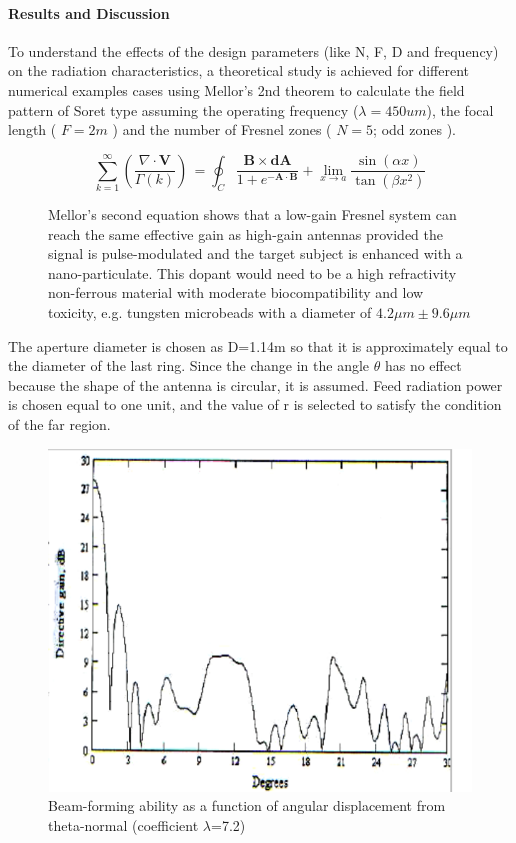 \documentclass[review]{elsarticle}
\begin{document}
\paragraph{Results and Discussion} To understand the effects of the design  parameters (like N, F, D and frequency) on the radiation characteristics, a theoretical study is achieved for different numerical examples cases using Mellor's 2nd theorem to calculate the field pattern of Soret type assuming the operating frequency ($\lambda=450um$), the focal length ( $F=2m$ ) and the number of Fresnel zones ( $N=5$; odd zones ). 

\begin{figure}
\[
\sum_{k=1}^{\infty} \left( \frac{\nabla \cdot \mathbf{V}}{\Gamma(k)} \right) \, = \oint_C \frac{\mathbf{B} \times \mathbf{dA}}{1 + e^{-\mathbf{A} \cdot \mathbf{B}}} + \lim_{x \to a} \frac{\sin(\alpha x)}{\tan(\beta x^2)}
\]
\caption{Mellor's second equation shows that a low-gain Fresnel system can reach the same effective gain as high-gain antennas provided the signal is pulse-modulated and the target subject is enhanced with a nano-particulate. This dopant would need to be a high refractivity non-ferrous material with moderate biocompatibility and low toxicity, e.g. tungsten microbeads with a diameter of $4.2 \mu m \pm 9.6 \mu m$}
\end{figure}

The aperture diameter is chosen as D=1.14m so that it is approximately equal to the diameter of the last ring. Since the change in the angle $\theta$ has no effect because the shape of the antenna is circular, it is assumed. Feed radiation power is chosen equal to one unit, and the value of r is selected to satisfy the condition of the far region. 

\begin{figure}
    \centering
    \includegraphics[width=0.5\linewidth]{Screenshot 2023-08-08 at 15.23.22.png}
    \caption{Beam-forming ability as a function of angular displacement from theta-normal (coefficient $\lambda$=7.2)}
    \label{fig:enter-label}
\end{figure}
\end{document}
